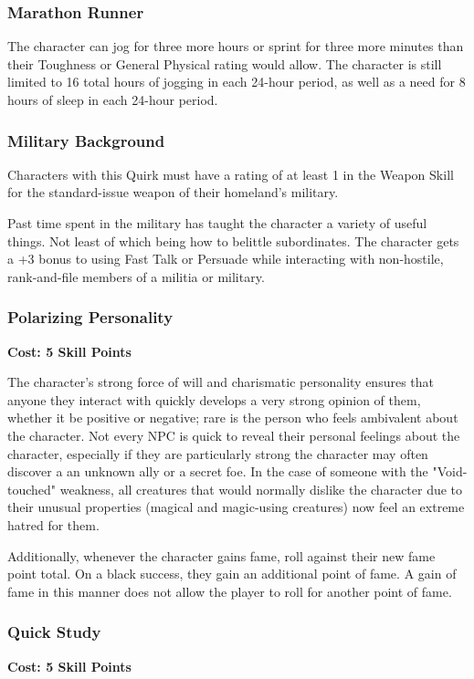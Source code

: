 \documentclass[oneside]{book}
\begin{document}
\begin{multicols}{2}
\subsubsection{Marathon Runner}
The character can jog for three more hours or sprint for three more minutes than their Toughness or General Physical rating would allow. The character is still limited to 16 total hours of jogging in each 24-hour period, as well as a need for 8 hours of sleep in each 24-hour period.

\subsubsection{Military Background}
Characters with this Quirk must have a rating of at least 1 in the Weapon Skill for the standard-issue weapon of their homeland's military. 

Past time spent in the military has taught the character a variety of useful things. Not least of which being how to belittle subordinates. The character gets a +3 bonus to using Fast Talk or Persuade while interacting with non-hostile, rank-and-file members of a militia or military. 

\subsubsection{Polarizing Personality}
\textbf{\small Cost: 5 Skill Points}

The character's strong force of will and charismatic personality ensures that anyone they interact with quickly develops a very strong opinion of them, whether it be positive or negative; rare is the person who feels ambivalent about the character. Not every NPC is quick to reveal their personal feelings about the character, especially if they are particularly strong the character may often discover a an unknown ally or a secret foe. In the case of someone with the "Void-touched" weakness, all creatures that would normally dislike the character due to their unusual properties (magical and magic-using creatures) now feel an extreme hatred for them.

Additionally, whenever the character gains fame, roll against their new fame point total. On a black success, they gain an additional point of fame. A gain of fame in this manner does not allow the player to roll for another point of fame.

\subsubsection{Quick Study}
\textbf{\small Cost: 5 Skill Points}


\end{multicols}
\end{document}
